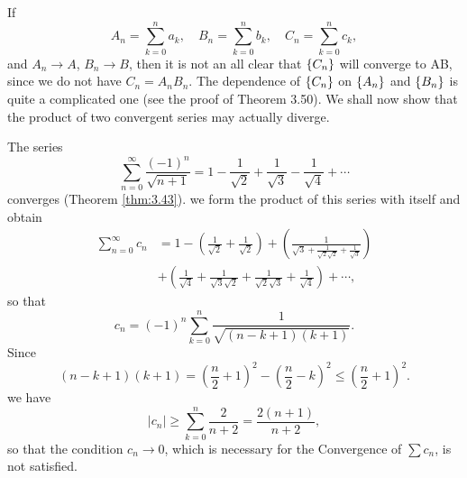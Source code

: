 \begin{newexample}
    If
    \begin{equation*}
        A_n = \sum_{k=0}^{n} a_k, \quad
        B_n = \sum_{k=0}^{n} b_k, \quad
        C_n = \sum_{k=0}^{n} c_k,
    \end{equation*}
    and 
    $A_n \rightarrow A$,
    $B_n \rightarrow B$,
    then it is not an all clear that $\protect\{C_n\}$ will converge to AB,
    since we do not have $C_n = A_n B_n$.
    The dependence of $\protect\{C_n\}$ on $\protect\{A_n\}$ and $\protect\{B_n\}$ 
    is quite a complicated one (see the proof of Theorem 3.50).
    We shall now show that the product of two convergent series may actually diverge.

    The series
    \begin{equation*}
        \sum_{n=0}^{\infty} \frac{(-1)^n}{\sqrt{n+1}} = 1
        - \frac{1}{\sqrt{2}} 
        + \frac{1}{\sqrt{3}}
        - \frac{1}{\sqrt{4}} 
        + \cdots
    \end{equation*}
    converges (Theorem \ref{thm:3.43}).
    we form the product of this series with itself and obtain
    \begin{align*}
        \sum_{n=0}^{\infty} c_n
        &= 1 - \left(
            \frac{1}{\sqrt{2}} 
            + \frac{1}{\sqrt{2}}
        \right) 
        + \left(
            \frac{1}{\sqrt{3} 
            + \frac{1}{\sqrt{2}\sqrt{2}} 
            + \frac{1}{\sqrt{3}}}
        \right) \\
        &+ \left(
            \frac{1}{\sqrt{4}}
            + \frac{1}{\sqrt{3}\sqrt{2}}
            + \frac{1}{\sqrt{2}\sqrt{3}}
            + \frac{1}{\sqrt{4}}
        \right) + \cdots,
    \end{align*}
    so that 
    \begin{equation*}
        c_n = (-1)^n \sum_{k=0}^{n}\frac{1}{\sqrt{(n-k+1)(k+1)}}.
    \end{equation*}
    Since
    \begin{equation*}
        (n-k+1)(k+1) =
        \left(\frac{n}{2} + 1 \right)^2 - 
        \left(\frac{n}{2} - k \right)^2
        \leq 
        \left(\frac{n}{2} + 1 \right)^2.
    \end{equation*}
    we have
    \begin{equation*}
        |c_n| \geq \sum_{k=0}^{n}\frac{2}{n+2} = \frac{2(n+1)}{n+2},
    \end{equation*}
    so that the condition $c_n \rightarrow 0$, which is necessary for the Convergence of $\sum c_n$, 
    is not satisfied.
\end{newexample}

